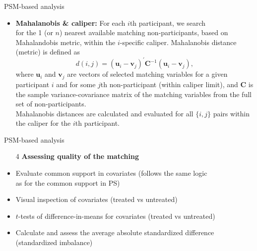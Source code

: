 \documentclass{beamer}
\begin{document}
\begin{frame}{PSM-based analysis}
\begin{itemize}
    \item \textbf{Mahalanobis \& caliper:} For each $i$th participant, we search \\for the 1 (or $n$) nearest available matching non-participants, based on Mahalandobis metric, within the $i$-specific caliper. Mahalanobis distance (metric) is defined as
    $$
    d(i,j) = (\bm{u}_i - \bm{v}_j)^{\prime} 
    \bm{C}^{-1} (\bm{u}_i - \bm{v}_j),
    $$
    where $\bm{u}_i$ and $\bm{v}_j$ are vectors of selected matching variables for a given participant $i$ and for some $j$th non-participant (within caliper limit), and $\bm{C}$ is the sample variance-covariance matrix of the matching variables from the full set of non-participants. \\ \medskip Mahalanobis distances are calculated and evaluated for all $\{i,j\}$ pairs within the caliper for the $i$th participant.
\end{itemize}
\end{frame}
\begin{frame}{PSM-based analysis}
\begin{enumerate}
    \item[4] \textbf{Assessing quality of the matching} \\ \smallskip
\end{enumerate}
\begin{itemize}
    \item Evaluate common support in covariates (follows the same logic \\as for the common support in PS)
    \smallskip
    \item Visual inspection of covariates (treated vs untreated)
    \smallskip
    \item $t$-tests of difference-in-means for covariates (treated vs untreated)
    \smallskip
    \item Calculate and assess the average absolute standardized difference (standardized imbalance)
\end{itemize}    
\end{frame}
\end{document}
